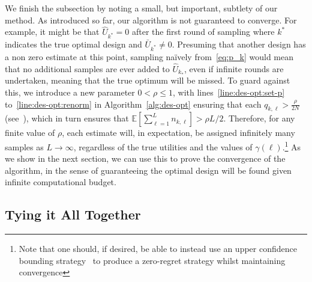 We finish the subsection by noting a small, but important, subtlety of our method.  As introduced so far, our algorithm
is not guaranteed to converge.  For example, it might be that $\hat{U}_{k^*} =0$ after the first round
of sampling where $k^*$ indicates the true optimal design and $\bar{U}_{k^*} \ne0$.  
Presuming that another design has a non zero estimate at this point, sampling na\"{i}vely from~\eqref{eq:p_k} would 
mean that no additional samples are ever added to $\hat{U}_{k_*}$, even if infinite rounds are undertaken,
meaning that the true optimum will be missed.  To guard against this, we introduce a new parameter $0<\rho\le1$, 
with lines~\ref{line:des-opt:set-p} to~\ref{line:des-opt:renorm} in Algorithm~\ref{alg:des-opt}
ensuring that each $q_{k,\ell}>\frac{\rho}{2N}$ (see~\cite{vincent2017darc}), which in turn ensures that  
$\mathbb{E}\left[\sum_{\ell=1}^{L} n_{k,\ell}\right] >\rho L/2$.
Therefore, for any finite value of $\rho$, each
estimate will, in expectation, be assigned infinitely many samples as $L\rightarrow\infty$, regardless
of the true utilities and the values of $\gamma(\ell)$.\footnote{Note that one should, if desired, be able to instead 
	use an upper confidence bounding strategy~\citep{auer2002using} to produce a zero-regret 
	strategy whilst maintaining convergence}
As we show in the next section, we can
use this to prove the convergence of the algorithm, in the sense of guaranteeing the optimal design
will be found given infinite computational budget.

\subsection{Tying it All Together}
\label{sec:tying-together}

